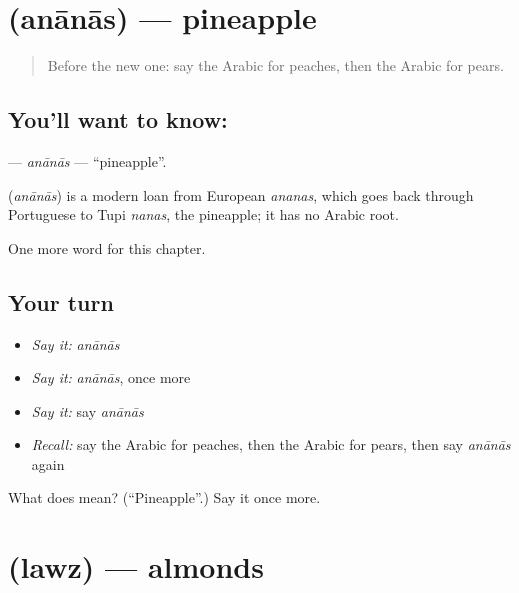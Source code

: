 \section[\texorpdfstring{\ar{أناناس} (anānās)}{أناناس (anānās)}]{ (anānās) — pineapple}

\label{lesson:AR-C244-ananas}



\begin{quote}
Before the new one: say the Arabic for peaches, then the Arabic for pears.
\end{quote}

\subsection*{You'll want to know: }
\textbf{} — \emph{anānās} — \textquotedblleft{}pineapple\textquotedblright{}.

\begin{cousinweb}
\textbf{} (\emph{anānās}) is a modern loan from European \emph{ananas}, which goes back through Portuguese to Tupi \emph{nanas}, the pineapple; it has no Arabic root.
\end{cousinweb}

\begin{grammarlens}[title={What you've built}]
One more word for this chapter.
\end{grammarlens}

\subsection*{Your turn}
\begin{itemize}
\raggedright
  \item \emph{Say it:} \emph{anānās}
  \item \emph{Say it:} \emph{anānās}, once more
  \item \emph{Say it:} say \emph{anānās}
  \item \emph{Recall:} say the Arabic for peaches, then the Arabic for pears, then say \emph{anānās} again
\end{itemize}

\begin{tcolorbox}[breakable,colback=teal!4,colframe=teal!35!black,title={Before you move on}]
What does  mean? (\textquotedblleft{}Pineapple\textquotedblright{}.) Say it once more.
\end{tcolorbox}
\section[\texorpdfstring{\ar{لوز} (lawz)}{لوز (lawz)}]{ (lawz) — almonds}

